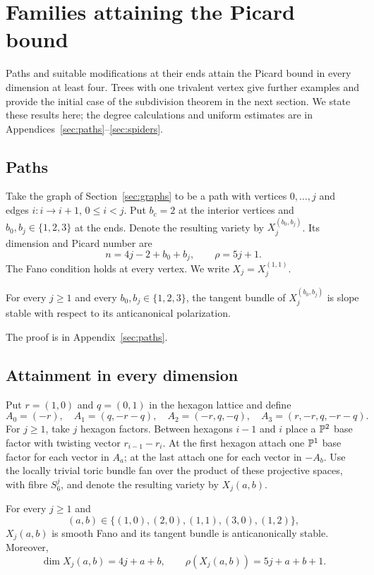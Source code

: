 \section{Families attaining the Picard bound}\label{sec:bundle-families}

Paths and suitable modifications at their ends attain the Picard bound
in every dimension at least four. Trees with one trivalent vertex give further
examples and provide the initial case of the subdivision theorem in
the next section. We state these results here; the degree calculations
and uniform estimates are in
Appendices~\ref{sec:paths}--\ref{sec:spiders}.

\subsection{Paths}

Take the graph of Section~\ref{sec:graphs} to be a path with vertices
$0,\ldots,j$ and edges $i\colon i\to i+1$, $0\le i<j$. Put $b_c=2$ at
the interior vertices and $b_0,b_j\in\{1,2,3\}$ at the ends. Denote the
resulting variety by $X_j^{(b_0,b_j)}$. Its dimension and Picard number are
\begin{equation}\label{path:dimension}
 n=4j-2+b_0+b_j,\qquad \rho=5j+1.
\end{equation}
The Fano condition holds at every vertex. We write $X_j=X_j^{(1,1)}$.

\begin{theorem}\label{path:stable}
For every $j\ge1$ and every $b_0,b_j\in\{1,2,3\}$, the tangent bundle of
$X_j^{(b_0,b_j)}$ is slope stable with respect to its anticanonical polarization.
\end{theorem}


The proof is in Appendix~\ref{sec:paths}.

\subsection{Attainment in every dimension}

Put $r=(1,0)$ and $q=(0,1)$ in the hexagon lattice and define
\[
 A_0=(-r),\quad A_1=(q,-r-q),\quad A_2=(-r,q,-q),\quad
 A_3=(r,-r,q,-r-q).
\]
For $j\ge1$, take $j$ hexagon factors. Between hexagons $i-1$ and $i$
place a $\mathbb{P}^2$ base factor with twisting vector $r_{i-1}-r_i$.
At the first hexagon attach one $\mathbb{P}^1$ base factor for each vector in
$A_a$; at the last attach one for each vector in $-A_b$. Use the locally
trivial toric bundle fan over the product of these projective spaces,
with fibre $S_6^j$, and denote the resulting variety by $X_j(a,b)$.
\begin{theorem}\label{attach:stable}
For every $j\ge1$ and
\[
 (a,b)\in\{(1,0),(2,0),(1,1),(3,0),(1,2)\},
\]
$X_j(a,b)$ is smooth Fano and its tangent bundle is anticanonically stable.
Moreover,
\[
 \dim X_j(a,b)=4j+a+b,\qquad \rho(X_j(a,b))=5j+a+b+1.
\]
\end{theorem}


